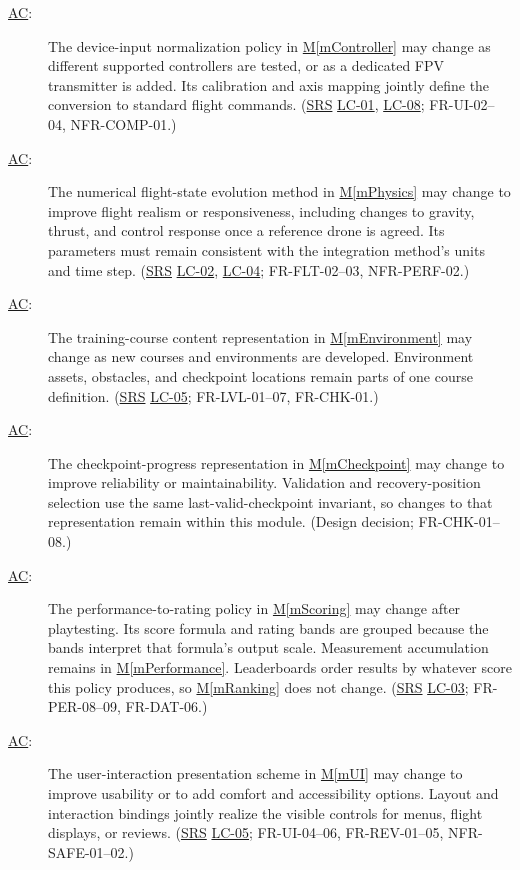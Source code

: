 \documentclass[12pt, titlepage]{article}
\DeclareRobustCommand{\mgabbr}[2]{\hyperlink{mg-abbr:#1}{#2}}
\newcounter{acnum}
\newcommand{\actheacnum}{\mgabbr{ac}{AC}\theacnum}
\newcommand{\mref}[1]{\hyperref[#1]{M\ref*{#1}}}
\begin{document}
\begin{description}

\item[ \actheacnum \label{acController}:]
The device-input normalization policy in \mref{mController} may change
as different supported controllers are tested, or as a dedicated FPV
transmitter is added. Its calibration and axis mapping jointly define the
conversion to standard flight commands.
(\mgabbr{srs}{SRS} \mgabbr{lc}{LC-01}, \mgabbr{lc}{LC-08}; FR-UI-02--04,
NFR-COMP-01.)

\item[ \actheacnum \label{acPhysics}:]
The numerical flight-state evolution method in \mref{mPhysics} may
change to improve flight realism or responsiveness, including changes to
gravity, thrust, and control response once a reference drone is agreed.
Its parameters must remain consistent with the integration method's units
and time step.
(\mgabbr{srs}{SRS} \mgabbr{lc}{LC-02}, \mgabbr{lc}{LC-04}; FR-FLT-02--03,
NFR-PERF-02.)

\item[ \actheacnum \label{acEnvironment}:]
The training-course content representation in \mref{mEnvironment}
may change as new courses and environments are developed. Environment
assets, obstacles, and checkpoint locations remain parts of one course
definition.
(\mgabbr{srs}{SRS} \mgabbr{lc}{LC-05}; FR-LVL-01--07, FR-CHK-01.)

\item[ \actheacnum \label{acCheckpoint}:]
The checkpoint-progress representation in \mref{mCheckpoint} may change
to improve reliability or maintainability. Validation and recovery-position
selection use the same last-valid-checkpoint invariant, so changes to
that representation remain within this module.
(Design decision; FR-CHK-01--08.)

\item[ \actheacnum \label{acScoring}:]
The performance-to-rating policy in \mref{mScoring} may change after
playtesting. Its score formula and rating bands are grouped because the
bands interpret that formula's output scale. Measurement accumulation
remains in \mref{mPerformance}. Leaderboards order results by whatever
score this policy produces, so \mref{mRanking} does not change.
(\mgabbr{srs}{SRS} \mgabbr{lc}{LC-03}; FR-PER-08--09, FR-DAT-06.)

\item[ \actheacnum \label{acUI}:]
The user-interaction presentation scheme in \mref{mUI} may change to
improve usability or to add comfort and accessibility options. Layout and
interaction bindings jointly realize the visible controls for menus,
flight displays, or reviews.
(\mgabbr{srs}{SRS} \mgabbr{lc}{LC-05}; FR-UI-04--06, FR-REV-01--05,
NFR-SAFE-01--02.)


\end{description}
\end{document}
